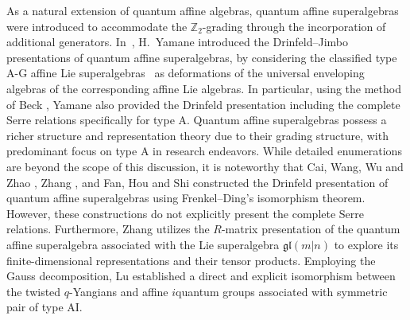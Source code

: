\documentclass[pdftex]{sigma}
\numberwithin{equation}{section}
\begin{document}
As a natural extension of quantum affine algebras, quantum affine superalgebras were introduced to accommodate the $\mathbb{Z}_2$-grading through the incorporation of additional generators.
In~\cite{HYAM}, H.~Yamane introduced the Drinfeld--Jimbo presentations of quantum affine superalgebras, by considering the classified type A-G affine Lie superalgebras~\cite{VGD3,VANDE} as deformations of the universal enveloping algebras of the corresponding affine Lie algebras. In particular, using the method of Beck \cite{JBECK}, Yamane also provided the Drinfeld presentation including the complete Serre relations specifically for type A.
Quantum affine superalgebras possess a richer structure and representation theory due to their grading structure, with predominant focus on type A in research endeavors. While detailed enumerations are beyond the scope of this discussion, it is noteworthy that Cai, Wang, Wu and Zhao \cite{JSKW}, Zhang \cite{YZC}, and Fan, Hou and Shi \cite{HBKD} constructed the Drinfeld presentation of quantum affine superalgebras  using Frenkel--Ding's isomorphism theorem. However, these constructions do not explicitly present the complete Serre relations. Furthermore,
Zhang \cite{Huafeng} utilizes the $R$-matrix presentation of the quantum affine superalgebra associated with the Lie superalgebra $\mathfrak{gl}(m|n)$ to explore its finite-dimensional representations and their tensor products. Employing the Gauss decomposition, Lu \cite{K-Lu} established a direct and explicit isomorphism between the twisted $q$-Yangians and affine $i$quantum groups associated with symmetric pair of type AI.
\end{document}
